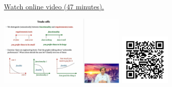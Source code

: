 
\begin{minipage}{10cm}
    \href{https://act4e-spring21.netlify.app/spring2021-tradeoffs:tradeoffs.html}{Watch online video (47 minutes).}
        
    \href{https://act4e-spring21.netlify.app/spring2021-tradeoffs:tradeoffs.html}{\includegraphics[height=3.5cm]{spring2021-tradeoffs:tradeoffs/thumbnails.jpg}}
    \href{https://act4e-spring21.netlify.app/spring2021-tradeoffs:tradeoffs.html}{\includegraphics[height=2.5cm]{spring2021-tradeoffs:tradeoffs/qrcode.png}}
\end{minipage}

